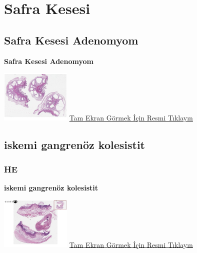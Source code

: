 \documentclass[
  letterpaper,
  DIV=11,
  numbers=noendperiod]{scrreprt}
\begin{document}
\hypertarget{sec-safra-kesesi}{%
\chapter{Safra Kesesi}\label{sec-safra-kesesi}}

\hypertarget{sec-safra-kesesi-adenomyom}{%
\section{Safra Kesesi Adenomyom}\label{sec-safra-kesesi-adenomyom}}

\textbf{Safra Kesesi Adenomyom}

\href{https://images.patolojiatlasi.com/gallbladder-adenomyoma/HE.html}{\includegraphics[width=0.25\textwidth,height=\textheight]{./screenshots/thumbnail_gallbladder-adenomyoma.png}}
\href{https://images.patolojiatlasi.com/gallbladder-adenomyoma/HE.html}{Tam
Ekran Görmek İçin Resmi Tıklayın}

\hypertarget{sec-ischemia-gangrenous-cholecystitis}{%
\section{iskemi gangrenöz
kolesistit}\label{sec-ischemia-gangrenous-cholecystitis}}

\hypertarget{he-9}{%
\subsection{HE}\label{he-9}}

\textbf{iskemi gangrenöz kolesistit}

\href{https://images.patolojiatlasi.com/ischemia-gangrenous-cholecystitis/HE.html}{\includegraphics[width=0.25\textwidth,height=\textheight]{./screenshots/thumbnail_ischemia-gangrenous-cholecystitis.png}}
\href{https://images.patolojiatlasi.com/ischemia-gangrenous-cholecystitis/HE.html}{Tam
Ekran Görmek İçin Resmi Tıklayın}
\end{document}
